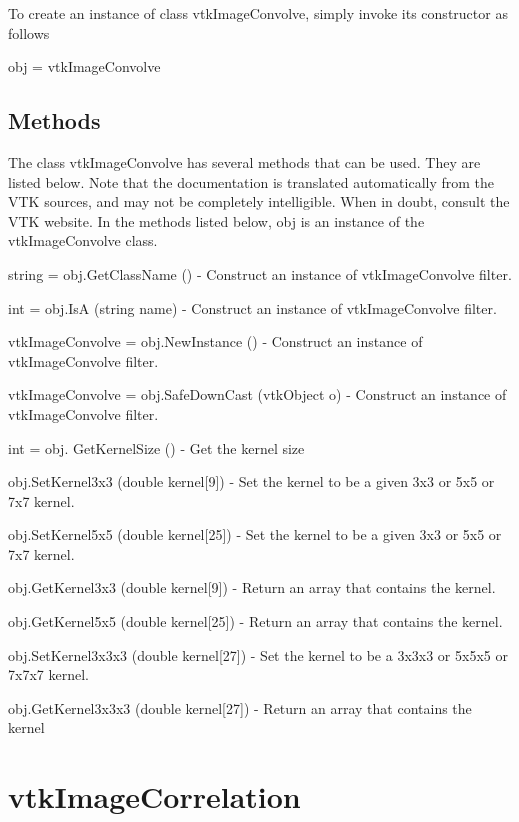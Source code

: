 To create an instance of class vtk\-Image\-Convolve, simply invoke its constructor as follows \begin{DoxyVerb}  obj = vtkImageConvolve
\end{DoxyVerb}
 \hypertarget{vtkwidgets_vtkxyplotwidget_Methods}{}\subsection{Methods}\label{vtkwidgets_vtkxyplotwidget_Methods}
The class vtk\-Image\-Convolve has several methods that can be used. They are listed below. Note that the documentation is translated automatically from the V\-T\-K sources, and may not be completely intelligible. When in doubt, consult the V\-T\-K website. In the methods listed below, {\ttfamily obj} is an instance of the vtk\-Image\-Convolve class. 
\begin{DoxyItemize}
\item {\ttfamily string = obj.\-Get\-Class\-Name ()} -\/ Construct an instance of vtk\-Image\-Convolve filter.  
\item {\ttfamily int = obj.\-Is\-A (string name)} -\/ Construct an instance of vtk\-Image\-Convolve filter.  
\item {\ttfamily vtk\-Image\-Convolve = obj.\-New\-Instance ()} -\/ Construct an instance of vtk\-Image\-Convolve filter.  
\item {\ttfamily vtk\-Image\-Convolve = obj.\-Safe\-Down\-Cast (vtk\-Object o)} -\/ Construct an instance of vtk\-Image\-Convolve filter.  
\item {\ttfamily int = obj. Get\-Kernel\-Size ()} -\/ Get the kernel size  
\item {\ttfamily obj.\-Set\-Kernel3x3 (double kernel\mbox{[}9\mbox{]})} -\/ Set the kernel to be a given 3x3 or 5x5 or 7x7 kernel.  
\item {\ttfamily obj.\-Set\-Kernel5x5 (double kernel\mbox{[}25\mbox{]})} -\/ Set the kernel to be a given 3x3 or 5x5 or 7x7 kernel.  
\item {\ttfamily obj.\-Get\-Kernel3x3 (double kernel\mbox{[}9\mbox{]})} -\/ Return an array that contains the kernel.  
\item {\ttfamily obj.\-Get\-Kernel5x5 (double kernel\mbox{[}25\mbox{]})} -\/ Return an array that contains the kernel.  
\item {\ttfamily obj.\-Set\-Kernel3x3x3 (double kernel\mbox{[}27\mbox{]})} -\/ Set the kernel to be a 3x3x3 or 5x5x5 or 7x7x7 kernel.  
\item {\ttfamily obj.\-Get\-Kernel3x3x3 (double kernel\mbox{[}27\mbox{]})} -\/ Return an array that contains the kernel  
\end{DoxyItemize}\hypertarget{vtkimaging_vtkimagecorrelation}{}\section{vtk\-Image\-Correlation}\label{vtkimaging_vtkimagecorrelation}
